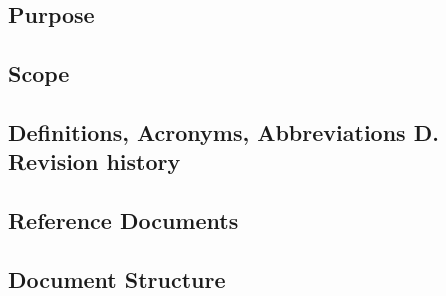 \subsection{Purpose}
\subsection{Scope}
\subsection{Definitions, Acronyms, Abbreviations D. Revision history}
\subsection{Reference Documents}
\subsection{Document Structure}




%
%
